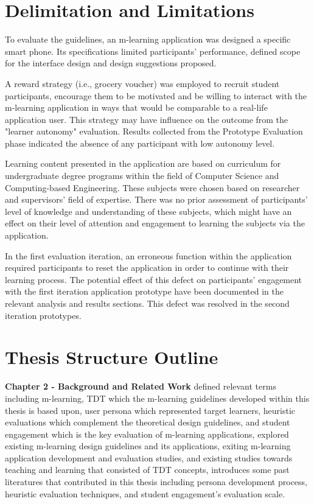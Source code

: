 \section{Delimitation and Limitations}

To evaluate the guidelines, an m-learning application was designed a specific smart phone. Its specifications limited participants' performance, defined scope for the interface design and design suggestions proposed. 

A reward strategy (i.e., grocery voucher) was employed to recruit student participants, encourage them to be motivated and be willing to interact with the m-learning application in ways that would be comparable to a real-life application user. This strategy may have influence on the outcome from the "learner autonomy" evaluation. Results collected from the Prototype Evaluation phase indicated the absence of any participant with low autonomy level. 

Learning content presented in the application are based on curriculum for undergraduate degree programs within the field of Computer Science and Computing-based Engineering. These subjects were chosen based on researcher and supervisors' field of expertise. There was no prior assessment of participants' level of knowledge and understanding of these subjects, which might have an effect on their level of attention and engagement to learning the subjects via the application. 

In the first evaluation iteration, an erroneous function within the application required participants to reset the application in order to continue with their learning process. The potential effect of this defect on participants' engagement with the first iteration application prototype have been documented in the relevant analysis and results sections. This defect was resolved in the second iteration prototypes. 

\section{Thesis Structure Outline}

\textbf{Chapter 2 - Background and Related Work} defined relevant terms including m-learning, TDT which the m-learning guidelines developed within this thesis is based upon, user persona which represented target learners, heuristic evaluations which complement the theoretical design guidelines, and student engagement which is the key evaluation of m-learning applications, explored existing m-learning design guidelines and its applications, exiting m-learning application development and evaluation studies, and existing studies towards teaching and learning that consisted of TDT concepts, introduces some past literatures that contributed in this thesis including persona development process, heuristic evaluation techniques, and student engagement's evaluation scale. 

